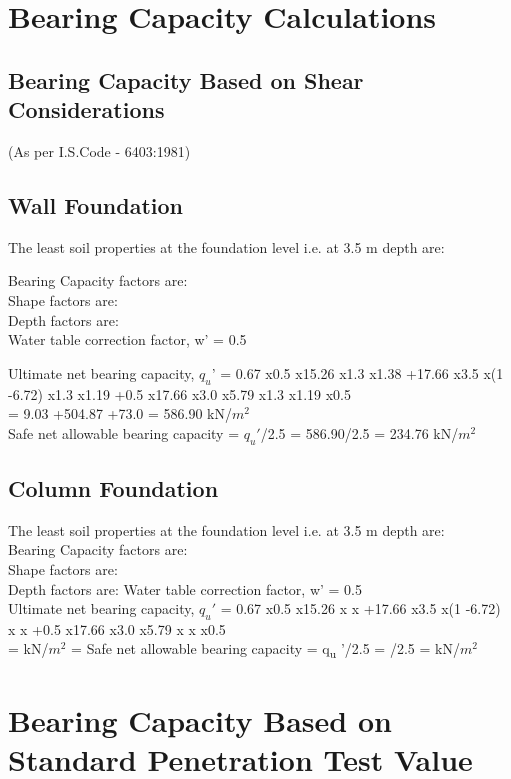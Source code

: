 \documentclass{soil12}
\begin{document}
\section{Bearing Capacity Calculations}
\subsection{Bearing Capacity Based on Shear Considerations}
(As per I.S.Code - 6403:1981)
\subsection{Wall Foundation}

The least soil properties at the foundation level i.e. at 3.5 m depth are:\\

Bearing Capacity factors are:\\
Shape factors are:\\
Depth factors are:\\    
Water table correction factor, w' = 0.5

Ultimate net bearing capacity, $q_u$' = 0.67 x0.5 x15.26 x1.3 x1.38 +17.66 x3.5 x(1 -6.72) x1.3 x1.19 +0.5 x17.66 x3.0 x5.79 x1.3 x1.19 x0.5\\
= 9.03 +504.87 +73.0 = 586.90 kN/$m^2$ \\	
Safe net allowable bearing capacity = $q_u'$/2.5 = 586.90/2.5 = 234.76 kN/$m^2$
\subsection{Column Foundation}
The least soil properties at the foundation level i.e. at 3.5 m depth are: \\
Bearing Capacity factors are:\\
Shape factors are:\\
Depth factors are:
Water table correction factor, w' = 0.5 \\
Ultimate net bearing capacity, $q_u'$ = 0.67 x0.5 x15.26 x x +17.66 x3.5 x(1 -6.72) x x 
+0.5 x17.66 x3.0 x5.79 x x x0.5\\
= kN/$m^2$ = Safe net allowable bearing capacity = q\textsubscript{u} '/2.5 = /2.5 = kN/$m^2$
\section{Bearing Capacity Based on Standard Penetration Test Value}
\end{document}
